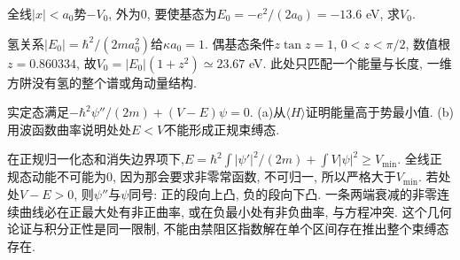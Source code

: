 \begin{exercise}
全线$|x|<a_0$势$-V_0$, 外为0, 要使基态为$E_0=-e^2/(2a_0)=-13.6$ eV, 求$V_0$.
\end{exercise}
\begin{solution}
氢关系$|E_0|=\hbar^2/(2ma_0^2)$给$\kappa a_0=1$. 偶基态条件$z\tan z=1$, $0<z<\pi/2$, 数值根$z=0.860334$, 故$V_0=|E_0|(1+z^2)\simeq23.67$ eV. 此处只匹配一个能量与长度, 一维方阱没有氢的整个谱或角动量结构.
\end{solution}
\begin{exercise}
实定态满足$-\hbar^2\psi''/(2m)+(V-E)\psi=0$. (a)从$\langle H\rangle$证明能量高于势最小值. (b)用波函数曲率说明处处$E<V$不能形成正规束缚态.
\end{exercise}
\begin{solution}
在正规归一化态和消失边界项下,$E=\hbar^2\int|\psi'|^2/(2m)+\int V|\psi|^2\geq V_{\min}$. 全线正规态动能不可能为0, 因为那会要求非零常函数, 不可归一, 所以严格大于$V_{\min}$. 若处处$V-E>0$, 则$\psi''$与$\psi$同号: 正的段向上凸, 负的段向下凸. 一条两端衰减的非零连续曲线必在正最大处有非正曲率, 或在负最小处有非负曲率, 与方程冲突. 这个几何论证与积分正性是同一限制, 不能由禁阻区指数解在单个区间存在推出整个束缚态存在.
\end{solution}

